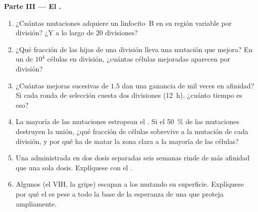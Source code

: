 \begin{problem}
\medskip
\noindent\textbf{Parte III --- El .}
\begin{enumerate}[resume]
  \item ¿Cuántas mutaciones adquiere un linfocito~B en su región variable
        por división? ¿Y a lo largo de $20$ divisiones?
  \item ¿Qué fracción de las hijas de una división lleva una mutación que
        mejora? En un  de $10^{4}$ células en división,
        ¿cuántas células mejoradas aparecen por división?
  \item ¿Cuántas mejoras sucesivas de $1.5$ dan una ganancia de mil veces
        en afinidad? Si cada ronda de selección cuesta dos divisiones
        (\qty{12}{h}), ¿cuánto tiempo es eso?
  \item La mayoría de las mutaciones estropean el . Si el
        \qty{50}{\%} de las mutaciones destruyen la unión, ¿qué fracción
        de células sobrevive a la mutación de cada división, y por qué ha
        de matar la zona clara a la mayoría de las células?
  \item Una  administrada en dos dosis separadas seis semanas
        rinde  de más afinidad que una sola dosis.
        Explíquese con el .
  \item Algunos  (el VIH, la gripe) escapan a los 
        mutando su superficie. Explíquese por qué el  es
        pese a todo la base de la esperanza de una  que proteja
        ampliamente.
\end{enumerate}


\end{problem}
